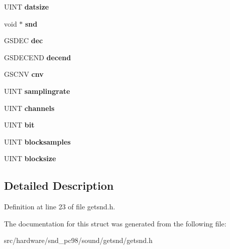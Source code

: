 \begin{DoxyCompactItemize}
\item 
\hypertarget{struct__getsnd_a905df1b38a1ca896d17944493f3852be}{U\-I\-N\-T {\bfseries datsize}}\label{struct__getsnd_a905df1b38a1ca896d17944493f3852be}

\item 
\hypertarget{struct__getsnd_acb268f642f71e9d3392510007f575dd2}{void $\ast$ {\bfseries snd}}\label{struct__getsnd_acb268f642f71e9d3392510007f575dd2}

\item 
\hypertarget{struct__getsnd_a17f0c515384018ea5d23d7798415d93c}{G\-S\-D\-E\-C {\bfseries dec}}\label{struct__getsnd_a17f0c515384018ea5d23d7798415d93c}

\item 
\hypertarget{struct__getsnd_a7e28927e7c2d7085a1ad2c91c87bf956}{G\-S\-D\-E\-C\-E\-N\-D {\bfseries decend}}\label{struct__getsnd_a7e28927e7c2d7085a1ad2c91c87bf956}

\item 
\hypertarget{struct__getsnd_aa4d6b73ec8a3b9e6915aae70905bdb2c}{G\-S\-C\-N\-V {\bfseries cnv}}\label{struct__getsnd_aa4d6b73ec8a3b9e6915aae70905bdb2c}

\item 
\hypertarget{struct__getsnd_af8d8a3433c4bc9540741f4ddb00eca15}{U\-I\-N\-T {\bfseries samplingrate}}\label{struct__getsnd_af8d8a3433c4bc9540741f4ddb00eca15}

\item 
\hypertarget{struct__getsnd_a8ecaa25d2d2d13ae56b0a51e38291b9e}{U\-I\-N\-T {\bfseries channels}}\label{struct__getsnd_a8ecaa25d2d2d13ae56b0a51e38291b9e}

\item 
\hypertarget{struct__getsnd_ae3af2b180a963000380bc1e6ee56fb75}{U\-I\-N\-T {\bfseries bit}}\label{struct__getsnd_ae3af2b180a963000380bc1e6ee56fb75}

\item 
\hypertarget{struct__getsnd_a80b80851fa5883af86e2be77c3445f89}{U\-I\-N\-T {\bfseries blocksamples}}\label{struct__getsnd_a80b80851fa5883af86e2be77c3445f89}

\item 
\hypertarget{struct__getsnd_a7f45cc2c7baf6f2df9f40e70c2d412ef}{U\-I\-N\-T {\bfseries blocksize}}\label{struct__getsnd_a7f45cc2c7baf6f2df9f40e70c2d412ef}

\end{DoxyCompactItemize}


\subsection{Detailed Description}


Definition at line 23 of file getsnd.\-h.



The documentation for this struct was generated from the following file\-:\begin{DoxyCompactItemize}
\item 
src/hardware/snd\-\_\-pc98/sound/getsnd/getsnd.\-h\end{DoxyCompactItemize}
